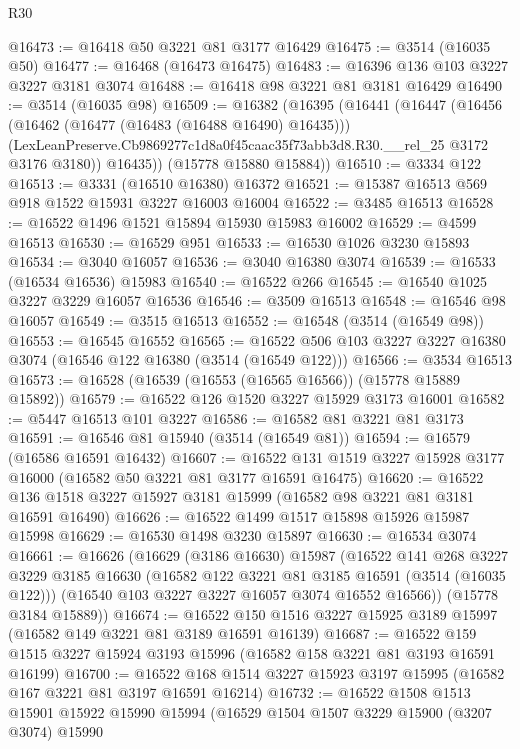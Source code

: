 \begin{lexlean}{R30}
\begin{coremodule}
@16473 := @16418 @50 @3221 @81 @3177 @16429
@16475 := @3514 (@16035 @50)
@16477 := @16468 (@16473 @16475)
@16483 := @16396 @136 @103 @3227 @3227 @3181 @3074
@16488 := @16418 @98 @3221 @81 @3181 @16429
@16490 := @3514 (@16035 @98)
@16509 := @16382
    (@16395
      (@16441
        (@16447
          (@16456
            (@16462 (@16477 (@16483 (@16488 @16490) @16435)))
            (LexLeanPreserve.Cb9869277c1d8a0f45caac35f73abb3d8.R30.__rel_25 @3172 @3176 @3180))
          @16435))
      (@15778 @15880 @15884))
@16510 := @3334 @122
@16513 := @3331 (@16510 @16380) @16372
@16521 := @15387 @16513 @569 @918 @1522 @15931 @3227 @16003 @16004
@16522 := @3485 @16513
@16528 := @16522 @1496 @1521 @15894 @15930 @15983 @16002
@16529 := @4599 @16513
@16530 := @16529 @951
@16533 := @16530 @1026 @3230 @15893
@16534 := @3040 @16057
@16536 := @3040 @16380 @3074
@16539 := @16533 (@16534 @16536) @15983
@16540 := @16522 @266
@16545 := @16540 @1025 @3227 @3229 @16057 @16536
@16546 := @3509 @16513
@16548 := @16546 @98 @16057
@16549 := @3515 @16513
@16552 := @16548 (@3514 (@16549 @98))
@16553 := @16545 @16552
@16565 := @16522 @506 @103 @3227 @3227 @16380 @3074 (@16546 @122 @16380 (@3514 (@16549 @122)))
@16566 := @3534 @16513
@16573 := @16528 (@16539 (@16553 (@16565 @16566)) (@15778 @15889 @15892))
@16579 := @16522 @126 @1520 @3227 @15929 @3173 @16001
@16582 := @5447 @16513 @101 @3227
@16586 := @16582 @81 @3221 @81 @3173
@16591 := @16546 @81 @15940 (@3514 (@16549 @81))
@16594 := @16579 (@16586 @16591 @16432)
@16607 := @16522 @131 @1519 @3227 @15928 @3177 @16000 (@16582 @50 @3221 @81 @3177 @16591 @16475)
@16620 := @16522 @136 @1518 @3227 @15927 @3181 @15999 (@16582 @98 @3221 @81 @3181 @16591 @16490)
@16626 := @16522 @1499 @1517 @15898 @15926 @15987 @15998
@16629 := @16530 @1498 @3230 @15897
@16630 := @16534 @3074
@16661 := @16626
    (@16629
      (@3186 @16630)
      @15987
      (@16522
        @141
        @268
        @3227
        @3229
        @3185
        @16630
        (@16582 @122 @3221 @81 @3185 @16591 (@3514 (@16035 @122)))
        (@16540 @103 @3227 @3227 @16057 @3074 @16552 @16566))
      (@15778 @3184 @15889))
@16674 := @16522 @150 @1516 @3227 @15925 @3189 @15997 (@16582 @149 @3221 @81 @3189 @16591 @16139)
@16687 := @16522 @159 @1515 @3227 @15924 @3193 @15996 (@16582 @158 @3221 @81 @3193 @16591 @16199)
@16700 := @16522 @168 @1514 @3227 @15923 @3197 @15995 (@16582 @167 @3221 @81 @3197 @16591 @16214)
@16732 := @16522
    @1508
    @1513
    @15901
    @15922
    @15990
    @15994
    (@16529
      @1504
      @1507
      @3229
      @15900
      (@3207 @3074)
      @15990

\end{coremodule}
\end{lexlean}
